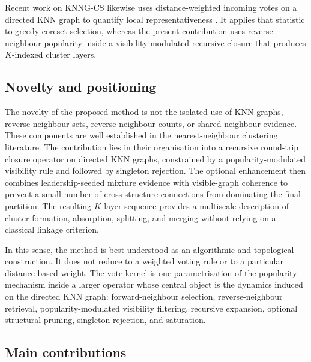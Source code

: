 \documentclass[pdflatex,sn-mathphys-num]{sn-jnl}
\begin{document}
Recent work on KNNG-CS likewise uses distance-weighted incoming votes on a directed KNN graph to quantify local representativeness \citep{LiuEtAl2026KNNGCS}. It applies that statistic to greedy coreset selection, whereas the present contribution uses reverse-neighbour popularity inside a visibility-modulated recursive closure that produces $K$-indexed cluster layers.

\subsection{Novelty and positioning}

The novelty of the proposed method is not the isolated use of KNN graphs, reverse-neighbour sets, reverse-neighbour counts, or shared-neighbour evidence. These components are well established in the nearest-neighbour clustering literature. The contribution lies in their organisation into a recursive round-trip closure operator on directed KNN graphs, constrained by a popularity-modulated visibility rule and followed by singleton rejection. The optional enhancement then combines leadership-seeded mixture evidence with visible-graph coherence to prevent a small number of cross-structure connections from dominating the final partition. The resulting $K$-layer sequence provides a multiscale description of cluster formation, absorption, splitting, and merging without relying on a classical linkage criterion.

In this sense, the method is best understood as an algorithmic and topological construction. It does not reduce to a weighted voting rule or to a particular distance-based weight. The vote kernel is one parametrisation of the popularity mechanism inside a larger operator whose central object is the dynamics induced on the directed KNN graph: forward-neighbour selection, reverse-neighbour retrieval, popularity-modulated visibility filtering, recursive expansion, optional structural pruning, singleton rejection, and saturation.

\subsection{Main contributions}
\end{document}
